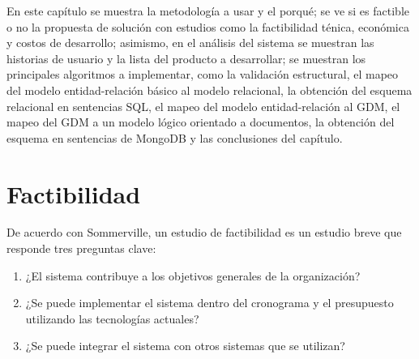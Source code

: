 





En este capítulo se muestra la metodología a usar y el porqué; se ve si es factible o no la propuesta de solución con estudios como la factibilidad ténica, económica y costos de desarrollo; asimismo, en el análisis del sistema se muestran las historias de usuario y la lista del producto a desarrollar; se muestran los principales algoritmos a implementar, como la validación estructural, el mapeo del modelo entidad-relación básico al modelo relacional, la obtención del esquema relacional en sentencias SQL, el mapeo del modelo entidad-relación al GDM, el mapeo del GDM a un modelo lógico orientado a documentos, la obtención del esquema en sentencias de MongoDB y las conclusiones del capítulo.



\section{Factibilidad}\label{ref:sec-factibilidad}

De acuerdo con Sommerville\cite{sommerville_software_2011}, un estudio de factibilidad es un estudio breve que responde tres preguntas clave:

\begin{enumerate}
    \item ¿El sistema contribuye a los objetivos generales de la organización? 
    \item ¿Se puede implementar el sistema dentro del cronograma y el presupuesto utilizando las tecnologías actuales? 
    \item ¿Se puede integrar el sistema con otros sistemas que se utilizan? 
\end{enumerate}


